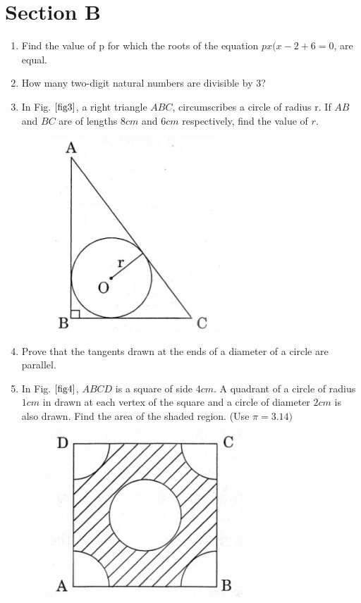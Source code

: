 \documentclass[journal,12pt,twocolumn]{IEEEtran}
\renewcommand\thesection{\arabic{section}}
\begin{document}
\section{Section B}
\renewcommand{\theequation}{\theenumi}
\begin{enumerate}[label=\thesection.\arabic*.,ref=\thesection.\theenumi]
\item Find the value of p for which the roots of the equation $px(x-2+6=0$, are equal.\\
\item How many two-digit natural numbers are divisible by 3?\\
\item In Fig. $\ref{fig3}$, a right triangle $ABC$, circumscribes a circle of radius r. If $AB$ and $BC$ are of lengths $8cm$ and $6cm$ respectively, find the value of $r$. \\
\begin{figure}[h!]
    \centering
    \includegraphics[width=0.5\columnwidth,center]{3.png}
    \caption{}
    \label{fig3}
 \end{figure}
\item Prove that the tangents drawn at the ends of a diameter of a circle are parallel.\\
\item In Fig. $\ref{fig4}$, $ABCD$ is a square of side $4 cm$. A quadrant of a circle of radius $1 cm$ in drawn at each vertex of the square and a circle of diameter $2 cm$ is also drawn. Find the area of the shaded region. (Use $\pi = 3.14)$\\
\begin{figure}[h!]
    \centering
    \includegraphics[width=0.5\columnwidth,center]{4.png}

\end{figure}
\end{enumerate}
\end{document}
